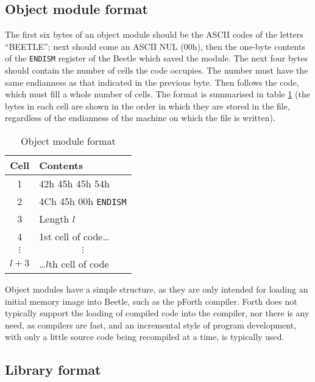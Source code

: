 \subsection{Object module format}
\label{object}

The first six bytes of an object module should be the ASCII codes of the letters
``BEETLE''; next should come an ASCII NUL (00h), then the one-byte contents of
the {\tt ENDISM} register of the Beetle which saved the module. The next four
bytes should contain the number of cells the code occupies. The number must have
the same endianness as that indicated in the previous byte. Then follows the
code, which must fill a whole number of cells. The format is summarised in table
\ref{objecttable} (the bytes in each cell are shown in the order in which they
are stored in the file, regardless of the endianness of the machine on which the
file is written).

\begin{table}[htbp]
\begin{center}
\begin{tabular}{|c|l|} \hline
\rule[-2mm]{0mm}{6mm}\bf Cell & \bf Contents \\ \hline
1 & 42h 45h 45h 54h \\ \hline
2 & 4Ch 45h 00h {\tt ENDISM} \\ \hline
3 & Length $l$\/ \\ \hline
4 & 1st cell of code\dots \\ \hline
$\vdots$ & \multicolumn{1}{c|}{$\vdots$} \\ \hline
$l+3$\/ & \dots$l$\/th cell of code \\ \hline
\end{tabular}
\end{center}
\vspace{-2mm}
\caption{\label{objecttable}Object module format}
\end{table}

Object modules have a simple structure, as they are only intended for loading an
initial memory image into Beetle, such as the pForth compiler. Forth does not
typically support the loading of compiled code into the compiler, nor there is
any need, as compilers are fast, and an incremental style of program
development, with only a little source code being recompiled at a time, is
typically used.


\subsection{Library format}

